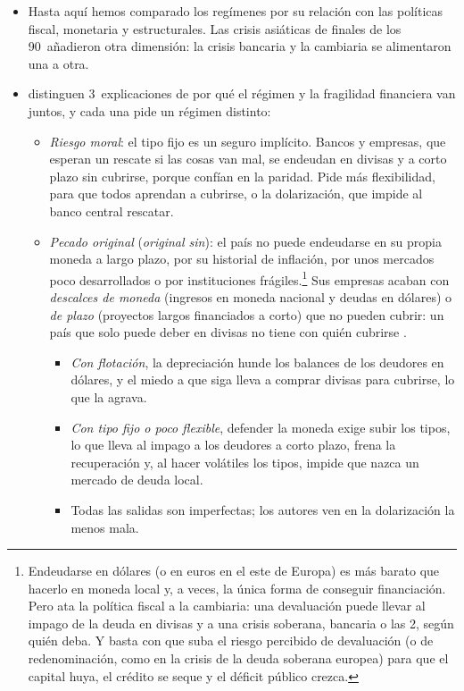 \documentclass[11pt]{article}
\begin{document}
\begin{itemize}
\item Hasta aquí hemos comparado los regímenes por su relación con las políticas fiscal, monetaria y estructurales. Las crisis asiáticas de finales de los 90~añadieron otra dimensión: la crisis bancaria y la cambiaria se alimentaron una a otra.
\item \textcite{EichengreenHausmann1999} distinguen 3~explicaciones de por qué el régimen y la fragilidad financiera van juntos, y cada una pide un régimen distinto:
  \begin{itemize}
  \item \emph{Riesgo moral}: el tipo fijo es un seguro implícito. Bancos y empresas, que esperan un rescate si las cosas van mal, se endeudan en divisas y a corto plazo sin cubrirse, porque confían en la paridad. Pide más flexibilidad, para que todos aprendan a cubrirse, o la dolarización, que impide al banco central rescatar.
  \item \emph{Pecado original} (\emph{original sin}): el país no puede endeudarse en su propia moneda a largo plazo, por su historial de inflación, por unos mercados poco desarrollados o por instituciones frágiles.\footnote{Endeudarse en dólares (o en euros en el este de Europa) es más barato que hacerlo en moneda local y, a veces, la única forma de conseguir financiación. Pero ata la política fiscal a la cambiaria: una devaluación puede llevar al impago de la deuda en divisas y a una crisis soberana, bancaria o las 2, según quién deba. Y basta con que suba el riesgo percibido de devaluación (o de redenominación, como en la crisis de la deuda soberana europea) para que el capital huya, el crédito se seque y el déficit público crezca.} Sus empresas acaban con \emph{descalces de moneda} (ingresos en moneda nacional y deudas en dólares) o \emph{de plazo} (proyectos largos financiados a corto) que no pueden cubrir: un país que solo puede deber en divisas no tiene con quién cubrirse .
    \begin{itemize}
    \item \emph{Con flotación}, la depreciación hunde los balances de los deudores en dólares, y el miedo a que siga lleva a comprar divisas para cubrirse, lo que la agrava.
    \item \emph{Con tipo fijo o poco flexible}, defender la moneda exige subir los tipos, lo que lleva al impago a los deudores a corto plazo, frena la recuperación y, al hacer volátiles los tipos, impide que nazca un mercado de deuda local.
    \item Todas las salidas son imperfectas; los autores ven en la dolarización la menos mala.

\end{itemize}
\end{itemize}
\end{itemize}
\end{document}
